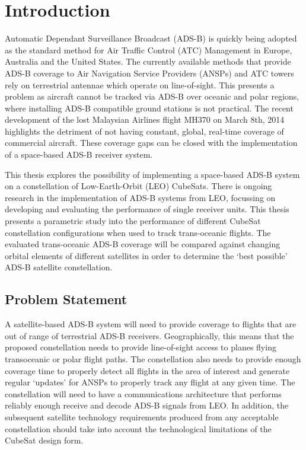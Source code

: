\chapter{Introduction}
Automatic Dependant Surveillance Broadcast (ADS-B) is quickly being adopted as the standard method for Air Traffic Control (ATC) Management in Europe, Australia and the United States. The currently available methods that provide ADS-B coverage to Air Navigation Service Providers (ANSPs) and ATC towers rely on terrestrial antennae which operate on line-of-sight. This presents a problem as aircraft cannot be tracked via ADS-B over oceanic and polar regions, where installing ADS-B compatible ground stations is not practical. The recent development of the lost Malaysian Airlines flight MH370 on March 8th, 2014 highlights the detriment of not having constant, global, real-time coverage of commercial aircraft. These coverage gaps can be closed with the implementation of a space-based ADS-B receiver system.

This thesis explores the possibility of implementing a space-based ADS-B system on a constellation of Low-Earth-Orbit (LEO) CubeSats. There is ongoing research in the implementation of ADS-B systems from LEO, focussing on developing and evaluating the performance of single receiver units. This thesis presents a parametric study into the performance of different CubeSat constellation configurations when used to track trans-oceanic flights. The evaluated trans-oceanic ADS-B coverage will be compared against changing orbital elements of different satellites in order to determine the `best possible' ADS-B satellite constellation. 

\section{Problem Statement}
A satellite-based ADS-B system will need to provide coverage to flights that are out of range of terrestrial ADS-B receivers. Geographically, this means that the proposed constellation needs to provide line-of-sight access to planes flying transoceanic or polar flight paths. The constellation also needs to provide enough coverage time to properly detect all flights in the area of interest and generate regular `updates' for ANSPs to properly track any flight at any given time. The constellation will need to have a communications architecture that performs reliably enough receive and decode ADS-B signals from LEO. In addition, the subsequent satellite technology requirements produced from any acceptable constellation should take into account the technological limitations of the CubeSat design form.

